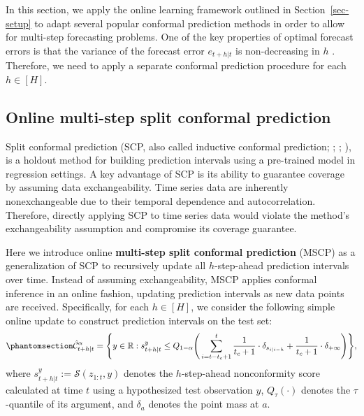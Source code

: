 \documentclass[
  11pt,
  a4paper,
]{article}
\theoremstyle{plain}
\theoremstyle{remark}
\begin{document}
In this section, we apply the online learning framework outlined in
Section~\ref{sec-setup} to adapt several popular conformal prediction
methods in order to allow for multi-step forecasting problems. One of
the key properties of optimal forecast errors is that the variance of
the forecast error \(e_{t+h|t}\) is non-decreasing in \(h\)
\autocite{diebold1996,patton2007}. Therefore, we need to apply a
separate conformal prediction procedure for each \(h \in [H]\).


\subsection{Online multi-step split conformal
prediction}\label{online-multi-step-split-conformal-prediction}

Split conformal prediction (SCP, also called inductive conformal
prediction; \textcite{papadopoulos2002}; \textcite{vovk2005};
\textcite{lei2018}), is a holdout method for building prediction
intervals using a pre-trained model in regression settings. A key
advantage of SCP is its ability to guarantee coverage by assuming data
exchangeability. Time series data are inherently nonexchangeable due to
their temporal dependence and autocorrelation. Therefore, directly
applying SCP to time series data would violate the method's
exchangeability assumption and compromise its coverage guarantee.

Here we introduce online \textbf{multi-step split conformal prediction}
(MSCP) as a generalization of SCP to recursively update all
\(h\)-step-ahead prediction intervals over time. Instead of assuming
exchangeability, MSCP applies conformal inference in an online fashion,
updating prediction intervals as new data points are received.
Specifically, for each \(h \in [H]\), we consider the following simple
online update to construct prediction intervals on the test set:
\begin{equation}\phantomsection\label{eq-mscp}{
\hat{\mathcal{C}}_{t+h|t}^{\alpha} = \Bigg\{y\in\mathbb{R}: s_{t+h|t}^{y} \leq Q_{1-\alpha}\Bigg(\sum_{i=t-t_c+1}^{t}\frac{1}{t_c+1}\cdot\delta_{s_{i|i-h}}+\frac{1}{t_c+1}\cdot\delta_{+\infty}\Bigg)\Bigg\},
}\end{equation} where \(s_{t+h|t}^{y}:=\mathcal{S}(z_{1:t}, y)\) denotes
the \(h\)-step-ahead nonconformity score calculated at time \(t\) using
a hypothesized test observation \(y\), \(Q_\tau(\cdot)\) denotes the
\(\tau\)-quantile of its argument, and \(\delta_a\) denotes the point
mass at \(a\).
\end{document}
